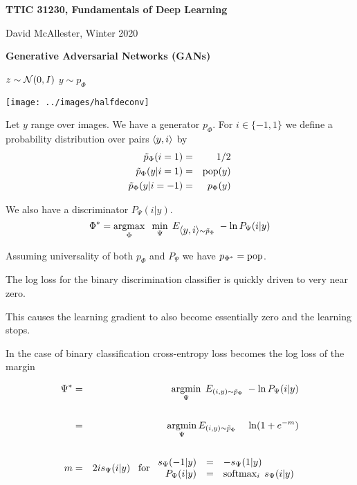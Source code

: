 





{\Huge

  \centerline{\bf TTIC 31230, Fundamentals of Deep Learning}
  \bigskip
  \centerline{David McAllester, Winter 2020}
  \vfill
  \centerline{\bf Generative Adversarial Networks (GANs)}
\vfill
\vfill

\centerline{$z\sim {\cal N}(0,I)$ \hspace{7em} $y\sim p_\Phi$}
\centerline{\texttt{[image: ../images/halfdeconv]}}



Let $y$ range over images.  We have a generator $p_\Phi$. For $i \in \{-1,1\}$ we define a probability distribution over pairs
${\mbox{$\langle y,i\rangle$}}$ by
\begin{eqnarray*}
\tilde{p}_\Phi(i = 1) & = & 1/2 \\
\tilde{p}_\Phi(y|i=1) & =&  \mathrm{pop}(y) \\
\tilde{p}_\Phi(y|i=-1) & = & p_\Phi(y)
\end{eqnarray*}

\vfill
We also have a discriminator $P_\Psi(i|y)$.
{\color{red} $$\Phi^* = \operatorname*{argmax}_\Phi\;\;\min_\Psi\;E_{{\mbox{$\langle y,i\rangle$}} \sim \tilde{p}_\Phi}\;-\ln P_\Psi(i|y)$$}

\vfill
\centerline{Assuming universality of both $p_\Phi$ and $P_\Psi$ we have {\color{red} $p_{\Phi^*} = \mathrm{pop}$}.}


The log loss for the binary discrimination classifier is quickly driven to very near zero.

\vfill
This causes the learning gradient to also become essentially zero and the learning stops.


In the case of binary classification cross-entropy loss becomes the log loss of the margin

\begin{eqnarray*}
\Psi^* & = & \operatorname*{argmin}_\Psi \;E_{(i,y) \sim \tilde{p}_\Phi}\;- \ln P_\Psi(i|y) \\
\\
& = & \operatorname*{argmin}_\Psi E_{(i,y) \sim \tilde{p}_\Phi}\;\;\;\;\ln(1 + e^{-m}) \\
\\
m & = & 2is_\Psi(i|y)\;\;\;\mbox{for $\begin{array}{rcl} s_\Psi(-1|y) & = & -s_\Psi(1|y) \\\;P_\Psi(i|y) & = & \operatorname*{softmax}_i\;s_\Psi(i|y) \end{array}$}
\end{eqnarray*}


}
